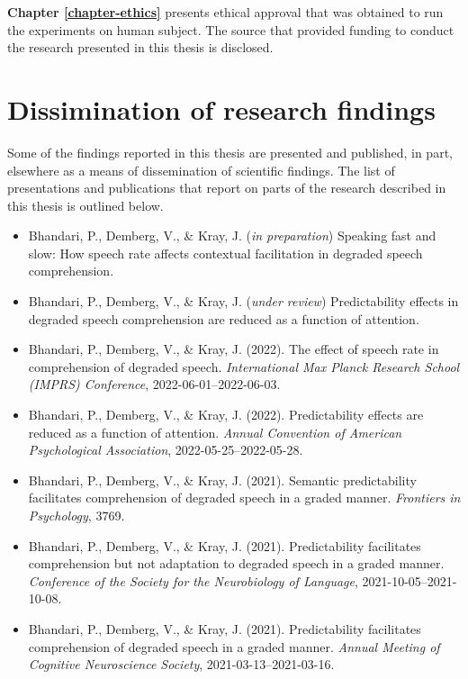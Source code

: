 \documentclass[a4paper, nobind]{templates/ociamthesis}
\providecommand{\tightlist}{%
  \setlength{\itemsep}{0pt}\setlength{\parskip}{0pt}}
\begin{document}
\noindent
\textbf{Chapter \ref{chapter-ethics}} presents ethical approval that was obtained to run the experiments on human subject.
The source that provided funding to conduct the research presented in this thesis is disclosed.

\hypertarget{dissimination-of-research-findings}{%
\section{Dissimination of research findings}\label{dissimination-of-research-findings}}

Some of the findings reported in this thesis are presented and published, in part, elsewhere as a means of dissemination of scientific findings.
The list of presentations and publications that report on parts of the research described in this thesis is outlined below.

\begin{itemize}
\item
  Bhandari, P., Demberg, V., \& Kray, J. (\emph{in preparation}) Speaking fast and slow: How speech rate affects contextual facilitation in degraded speech comprehension.
\item
  Bhandari, P., Demberg, V., \& Kray, J. (\emph{under review}) Predictability effects in degraded speech comprehension are reduced as a function of attention.
\item
  Bhandari, P., Demberg, V., \& Kray, J. (2022). The effect of speech rate in comprehension of degraded speech. \emph{International Max Planck Research School (IMPRS) Conference}, 2022-06-01--2022-06-03.
\item
  Bhandari, P., Demberg, V., \& Kray, J. (2022). Predictability effects are reduced as a function of attention. \emph{Annual Convention of American Psychological Association}, 2022-05-25--2022-05-28.
\item
  Bhandari, P., Demberg, V., \& Kray, J. (2021). Semantic predictability facilitates comprehension of degraded speech in a graded manner. \emph{Frontiers in Psychology}, 3769.
\item
  Bhandari, P., Demberg, V., \& Kray, J. (2021). Predictability facilitates comprehension but not adaptation to degraded speech in a graded manner. \emph{Conference of the Society for the Neurobiology of Language}, 2021-10-05--2021-10-08.
\end{itemize}

\begin{itemize}
\tightlist
\item
  Bhandari, P., Demberg, V., \& Kray, J. (2021). Predictability facilitates comprehension of degraded speech in a graded manner. \emph{Annual Meeting of Cognitive Neuroscience Society}, 2021-03-13--2021-03-16.
\end{itemize}
\end{document}
